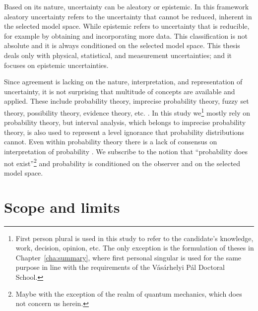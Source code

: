 Based on its nature, uncertainty can be aleatory or epistemic. In this framework aleatory uncertainty refers to the uncertainty that cannot be reduced, inherent in the selected model space. While epistemic refers to uncertainty that is reducible, for example by obtaining and incorporating more data. This classification is not absolute and it is always conditioned on the selected model space. 
This thesis deals only with physical, statistical, and measurement uncertainties; and it focuses on epistemic uncertainties.

Since agreement is lacking on the nature, interpretation, and representation of uncertainty, it is not surprising that multitude of concepts are available and applied. These include probability theory, imprecise probability theory, fuzzy set theory, possibility theory, evidence theory, etc. \citep{Corotis2015, Ayyub2006}. In this study we\footnote{First person plural is used in this study to refer to the candidate's knowledge, work, decision, opinion, etc. The only exception is the formulation of theses in Chapter~\ref{cha:summary}, where first personal singular is used for the same purpose in line with the requirements of the Vásárhelyi Pál Doctoral School.} mostly rely on probability theory, but interval analysis, which belongs to imprecise probability theory, is also used to represent a level ignorance that probability distributions cannot. Even within probability theory there is a lack of consensus on interpretation of probability \citep{Hajek2012}. We subscribe to the notion that ``probability does not exist''\footnote{Maybe with the exception of the realm of quantum mechanics, which does not concern us herein.} \citep{Finetti1974} and probability is conditioned on the observer and on the selected model space.



\section{Scope and limits} 
\label{sec:scope}

